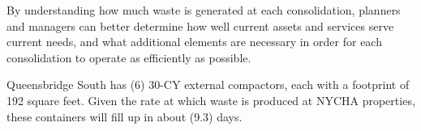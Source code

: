 
    By understanding how much waste is generated at each consolidation, planners and managers
    can better determine how well current assets and services serve current needs, and what additional 
    elements are necessary in order for each consolidation to operate as efficiently as possible. 

    Queensbridge South has (6) 30-CY external compactors, each with a footprint of 192 square feet. Given the rate at which waste is produced at NYCHA properties, these containers will fill
    up in about (9.3) days.